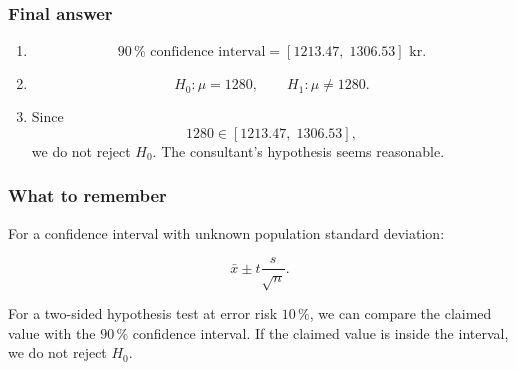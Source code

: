 \documentclass[10pt]{article}
\begin{document}
\subsubsection*{Final answer}
\begin{enumerate}[label=\alph*)]
\item
\[
90\,\%\text{ confidence interval}
=
[1213.47,\;1306.53]\text{ kr}.
\]

\item
\[
H_0:\mu=1280,
\qquad
H_1:\mu\neq 1280.
\]

\item
Since
\[
1280\in [1213.47,\;1306.53],
\]
we do not reject $H_0$.
The consultant's hypothesis seems reasonable.
\end{enumerate}

\subsubsection*{What to remember}
For a confidence interval with unknown population standard deviation:

\[
\bar{x}\pm t\frac{s}{\sqrt{n}}.
\]

For a two-sided hypothesis test at error risk $10\,\%$,
we can compare the claimed value with the $90\,\%$ confidence interval.
If the claimed value is inside the interval, we do not reject $H_0$.
\end{document}
